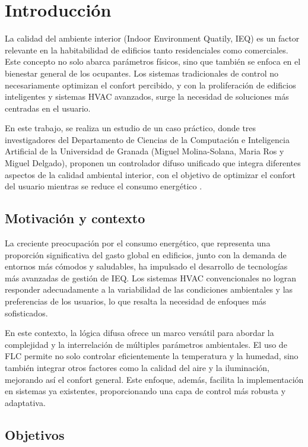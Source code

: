 \section{Introducción}

La calidad del ambiente interior (Indoor Environment Quatily, IEQ) es un factor relevante en la habitabilidad de edificios tanto residenciales como comerciales. Este concepto no solo abarca parámetros físicos, sino que también se enfoca en el bienestar general de los ocupantes. Los sistemas tradicionales de control no necesariamente optimizan el confort percibido, y con la proliferación de edificios inteligentes y sistemas HVAC avanzados, surge la necesidad de soluciones más centradas en el usuario.

En este trabajo, se realiza un estudio de un caso práctico, donde tres investigadores del Departamento de Ciencias de la Computación e Inteligencia Artificial de la Universidad de Granada (Miguel Molina-Solana, Maria Ros y Miguel Delgado), proponen un controlador difuso unificado que integra diferentes aspectos de la calidad ambiental interior, con el objetivo de optimizar el confort del usuario mientras se reduce el consumo energético \parencite{molina2013unifying}.

\subsection{Motivación y contexto}

La creciente preocupación por el consumo energético, que representa una proporción significativa del gasto global en edificios, junto con la demanda de entornos más cómodos y saludables, ha impulsado el desarrollo de tecnologías más avanzadas de gestión de IEQ. Los sistemas HVAC convencionales no logran responder adecuadamente a la variabilidad de las condiciones ambientales y las preferencias de los usuarios, lo que resalta la necesidad de enfoques más sofisticados.

En este contexto, la lógica difusa ofrece un marco versátil para abordar la complejidad y la interrelación de múltiples parámetros ambientales. El uso de FLC permite no solo controlar eficientemente la temperatura y la humedad, sino también integrar otros factores como la calidad del aire y la iluminación, mejorando así el confort general. Este enfoque, además, facilita la implementación en sistemas ya existentes, proporcionando una capa de control más robusta y adaptativa.


\subsection{Objetivos}

